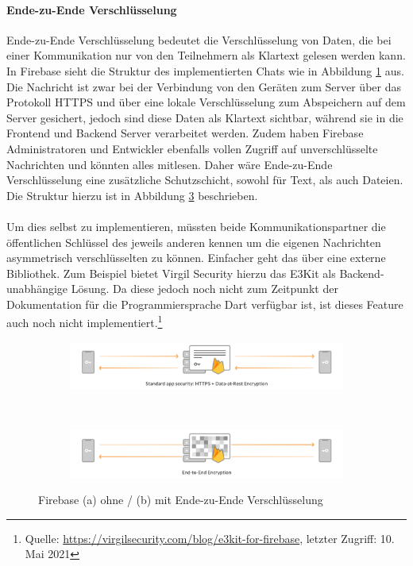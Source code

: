 \paragraph{Ende-zu-Ende Verschlüsselung}
Ende-zu-Ende Verschlüsselung bedeutet die Verschlüsselung von Daten, die bei einer Kommunikation nur von den Teilnehmern als Klartext gelesen werden kann.
In Firebase sieht die Struktur des implementierten Chats wie in Abbildung \ref{fig:firebase_without_encryption} aus.
Die Nachricht ist zwar bei der Verbindung von den Geräten zum Server über das Protokoll HTTPS und über eine lokale Verschlüsselung zum Abspeichern auf dem Server gesichert, jedoch sind diese Daten als Klartext sichtbar, während sie in die Frontend und Backend Server verarbeitet werden.
Zudem haben Firebase Administratoren und Entwickler ebenfalls vollen Zugriff auf unverschlüsselte Nachrichten und könnten alles mitlesen.
Daher wäre Ende-zu-Ende Verschlüsselung eine zusätzliche Schutzschicht, sowohl für Text, als auch Dateien.
Die Struktur hierzu ist in Abbildung \ref{fig:firebase_with_encryption} beschrieben.\\
\\
Um dies selbst zu implementieren, müssten beide Kommunikationspartner die öffentlichen Schlüssel des jeweils anderen kennen um die eigenen Nachrichten asymmetrisch verschlüsselten zu können.
Einfacher geht das über eine externe Bibliothek.
Zum Beispiel bietet Virgil Security hierzu das E3Kit als Backend-unabhängige Lösung.
Da diese jedoch noch nicht zum Zeitpunkt der Dokumentation für die Programmiersprache Dart verfügbar ist, ist dieses Feature auch noch nicht implementiert.\footnote{Quelle: \url{https://virgilsecurity.com/blog/e3kit-for-firebase}, letzter Zugriff: 10. Mai 2021}
\begin{figure}[tbt]
	\begin{subfigure}{\textwidth}
		\centering
		\includegraphics[width=15cm]{Backend_Implementierung/images/firebase_without_p2p_encryption.png}
		\caption{}
		\label{fig:firebase_without_encryption}
	\end{subfigure}\\
	\begin{subfigure}{\textwidth}
		\centering
		\includegraphics[width=15cm]{Backend_Implementierung/images/firebase_with_p2p_encryption.png}
		\caption{}
		\label{fig:firebase_with_encryption}
	\end{subfigure}
	\caption[]{ Firebase (a) ohne / (b) mit Ende-zu-Ende Verschlüsselung \protect \footnotemark}
\end{figure}
